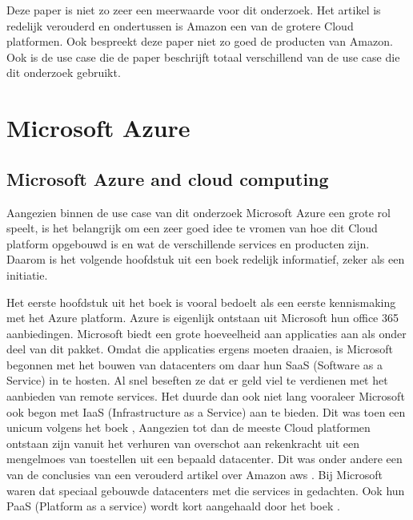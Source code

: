 Deze paper \autocite{Jackson2010} is niet zo zeer een meerwaarde voor dit onderzoek. Het artikel is redelijk verouderd en ondertussen is Amazon een van de grotere Cloud platformen. Ook bespreekt deze paper niet zo goed de producten van Amazon. Ook is de use case die de paper beschrijft totaal verschillend van de use case die dit onderzoek gebruikt. 

\section{Microsoft Azure}
\subsection{Microsoft Azure and cloud computing}
Aangezien binnen de use case van dit onderzoek Microsoft Azure een grote rol speelt, is het belangrijk om een zeer goed idee te vromen van hoe dit Cloud platform opgebouwd is en wat de verschillende services en producten zijn. Daarom is het volgende hoofdstuk uit een boek \autocite{Copeland2015} redelijk informatief, zeker als een initiatie.

Het eerste hoofdstuk uit het boek \autocite{Copeland2015} is vooral bedoelt als een eerste kennismaking met het Azure platform. Azure is eigenlijk ontstaan uit Microsoft hun office 365 aanbiedingen. Microsoft biedt een grote hoeveelheid aan applicaties aan als onder deel van dit pakket. Omdat die applicaties ergens moeten draaien, is Microsoft begonnen met het bouwen van datacenters om daar hun SaaS (Software as a Service) in te hosten. Al snel beseften ze dat er geld viel te verdienen met het aanbieden van remote services. Het duurde dan ook niet lang vooraleer Microsoft ook begon met IaaS (Infrastructure as a Service) aan te bieden. Dit was toen een unicum volgens het boek \autocite{Copeland2015}, Aangezien tot dan de meeste Cloud platformen ontstaan zijn vanuit het verhuren van overschot aan rekenkracht uit een mengelmoes van toestellen uit een bepaald datacenter. Dit was onder andere een van de conclusies van een verouderd artikel over Amazon aws \autocite{Jackson2010}. Bij Microsoft waren dat speciaal gebouwde datacenters met die services in gedachten. Ook hun PaaS (Platform as a service) wordt kort aangehaald door het boek \autocite{Copeland2015}.

